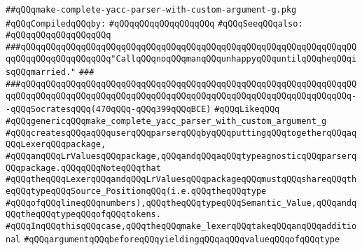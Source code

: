 \label{src/app/yacc/lib/make-complete-yacc-parser-with-custom-argument-g.pkg}
\verb|##qQQqmake-complete-yacc-parser-with-custom-argument-g.pkg|\newline
\newline
\verb|#qQQqCompiledqQQqby:|\newline
\verb|#qQQqqQQqqQQqqQQqqQQq|\newline
\newline
\verb|#qQQqSeeqQQqalso:|\newline
\verb|#qQQqqQQqqQQqqQQqqQQq|\newline
\newline
\newline
\verb|###qQQqqQQqqQQqqQQqqQQqqQQqqQQqqQQqqQQqqQQqqQQqqQQqqQQqqQQqqQQqqQQqqQQqqQQqqQQqqQQqqQQqqQQq"CallqQQqnoqQQqmanqQQqunhappyqQQquntilqQQqheqQQqisqQQqmarried."|\newline
\verb|###|\newline
\verb|###qQQqqQQqqQQqqQQqqQQqqQQqqQQqqQQqqQQqqQQqqQQqqQQqqQQqqQQqqQQqqQQqqQQqqQQqqQQqqQQqqQQqqQQqqQQqqQQqqQQqqQQqqQQqqQQqqQQqqQQqqQQqqQQqqQQqqQQq--qQQqSocratesqQQq(470qQQq-qQQq399qQQqBCE)|\newline
\newline
\newline
\newline
\verb|#qQQqLikeqQQq|\newline
\verb|#qQQqgenericqQQqmake_complete_yacc_parser_with_custom_argument_g|\newline
\verb|#qQQqcreatesqQQqaqQQquserqQQqparserqQQqbyqQQqputtingqQQqtogetherqQQqaqQQqLexerqQQqpackage,|\newline
\verb|#qQQqanqQQqLrValuesqQQqpackage,qQQqandqQQqaqQQqtypeagnosticqQQqparserqQQqpackage.qQQqqQQqNoteqQQqthat|\newline
\verb|#qQQqtheqQQqLexerqQQqandqQQqLrValuesqQQqpackageqQQqmustqQQqshareqQQqtheqQQqtypeqQQqSource_PositionqQQq(i.e.qQQqtheqQQqtype|\newline
\verb|#qQQqofqQQqlineqQQqnumbers),qQQqtheqQQqtypeqQQqSemantic_Value,qQQqandqQQqtheqQQqtypeqQQqofqQQqtokens.|\newline
\newline
\verb|#qQQqInqQQqthisqQQqcase,qQQqtheqQQqmake_lexerqQQqtakeqQQqanqQQqadditional|\newline
\verb|#qQQqargumentqQQqbeforeqQQqyieldingqQQqaqQQqvalueqQQqofqQQqtype|\newline
